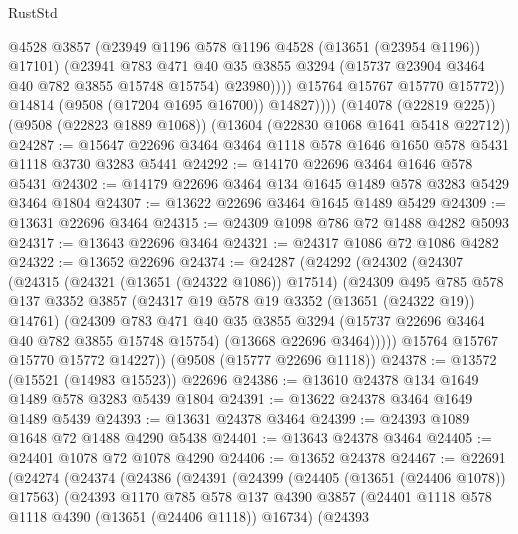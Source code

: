 \begin{lexlean}{RustStd}
\begin{coremodule}
                      @4528
                      @3857
                      (@23949 @1196 @578 @1196 @4528 (@13651 (@23954 @1196)) @17101)
                      (@23941
                        @783
                        @471
                        @40
                        @35
                        @3855
                        @3294
                        (@15737 @23904 @3464 @40 @782 @3855 @15748 @15754)
                        @23980))))
                @15764
                @15767
                @15770
                @15772))
            @14814
            (@9508 (@17204 @1695 @16700))
            @14827))))
    (@14078 (@22819 @225))
    (@9508 (@22823 @1889 @1068))
    (@13604 (@22830 @1068 @1641 @5418 @22712))
@24287 := @15647 @22696 @3464 @3464 @1118 @578 @1646 @1650 @578 @5431 @1118 @3730 @3283 @5441
@24292 := @14170 @22696 @3464 @1646 @578 @5431
@24302 := @14179 @22696 @3464 @134 @1645 @1489 @578 @3283 @5429 @3464 @1804
@24307 := @13622 @22696 @3464 @1645 @1489 @5429
@24309 := @13631 @22696 @3464
@24315 := @24309 @1098 @786 @72 @1488 @4282 @5093
@24317 := @13643 @22696 @3464
@24321 := @24317 @1086 @72 @1086 @4282
@24322 := @13652 @22696
@24374 := @24287
    (@24292
      (@24302
        (@24307
          (@24315
            (@24321 (@13651 (@24322 @1086)) @17514)
            (@24309
              @495
              @785
              @578
              @137
              @3352
              @3857
              (@24317 @19 @578 @19 @3352 (@13651 (@24322 @19)) @14761)
              (@24309
                @783
                @471
                @40
                @35
                @3855
                @3294
                (@15737 @22696 @3464 @40 @782 @3855 @15748 @15754)
                (@13668 @22696 @3464)))))
        @15764
        @15767
        @15770
        @15772
        @14227))
    (@9508 (@15777 @22696 @1118))
@24378 := @13572 (@15521 (@14983 @15523)) @22696
@24386 := @13610 @24378 @134 @1649 @1489 @578 @3283 @5439 @1804
@24391 := @13622 @24378 @3464 @1649 @1489 @5439
@24393 := @13631 @24378 @3464
@24399 := @24393 @1089 @1648 @72 @1488 @4290 @5438
@24401 := @13643 @24378 @3464
@24405 := @24401 @1078 @72 @1078 @4290
@24406 := @13652 @24378
@24467 := @22691
    (@24274
      (@24374
        (@24386
          (@24391
            (@24399
              (@24405 (@13651 (@24406 @1078)) @17563)
              (@24393
                @1170
                @785
                @578
                @137
                @4390
                @3857
                (@24401 @1118 @578 @1118 @4390 (@13651 (@24406 @1118)) @16734)
                (@24393

\end{coremodule}
\end{lexlean}
